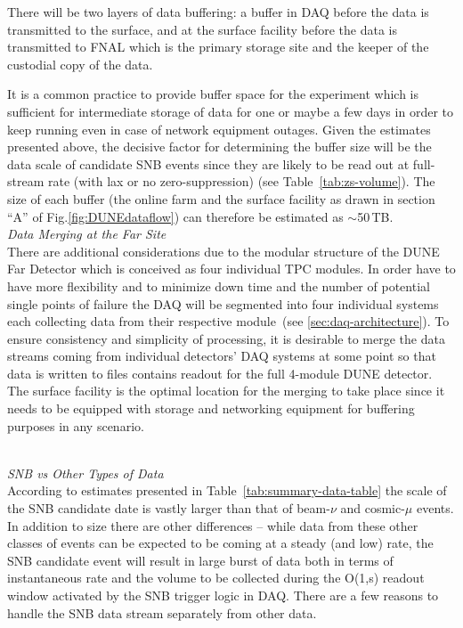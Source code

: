 There will be two layers of data buffering: a buffer in DAQ before the data is transmitted to the surface,
and at the surface facility before the data is transmitted to FNAL which is the primary storage site and the
keeper of the custodial copy of the data.

It is a common practice to provide buffer space for the experiment which is sufficient for intermediate storage of data
for one or maybe a few days in order to keep running even in case of network equipment outages. Given the estimates
presented above, the decisive factor for determining the buffer size will be the data scale of candidate SNB events since
they are likely to be read out at full-stream rate (with lax or no zero-suppression) (see Table~\ref{tab:zs-volume}). The
size of each buffer (the online farm and the surface facility as drawn in section ``A'' of Fig.\ref{fig:DUNEdataflow})
can therefore be estimated as $\sim$50\,TB.
\ 
\\

\noindent
\textit{Data Merging at the Far Site} 
\ 
\\
\noindent
There are additional considerations due to the modular structure of the DUNE Far Detector
which is conceived as four individual TPC modules. In order have to have more flexibility and to minimize down time
and the number of potential single points of failure the DAQ will be segmented into four individual  systems each collecting
data from their respective module~(see \ref{sec:daq-architecture}). To ensure
consistency and simplicity of processing, it is desirable to merge the data streams coming from individual
detectors' DAQ systems at some point so that data is written to files contains readout for the full 4-module
DUNE detector. The surface facility is the optimal location for the merging to take place since it needs to be
equipped with storage and networking equipment for buffering purposes in any scenario.

\ 
\\
\noindent
\textit{SNB vs Other Types of Data} 
\ 
\\
\noindent
According to estimates presented in Table~\ref{tab:summary-data-table} the scale of the SNB candidate date  is vastly larger than
that of beam-$\nu$ and cosmic-$\mu$ events. In addition to size there are other differences -- while data from these other classes of events
can be expected to be coming at a steady (and low) rate, the SNB candidate event will result in large burst of data both in terms of
instantaneous rate and the volume to be collected during the O(1,s) readout window activated by the SNB trigger logic in DAQ.
There are a few reasons to handle the SNB data stream separately from other data.

